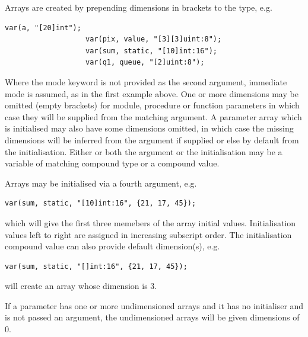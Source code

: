                 Arrays are created by prepending dimensions in brackets
                to the type, e.g.
                \begin{lstlisting}[gobble=16, language=threepl]
                   var(a, "[20]int");
                   var(pix, value, "[3][3]uint:8");
                   var(sum, static, "[10]int:16");
                   var(q1, queue, "[2]uint:8");
                \end{lstlisting}
                Where the mode keyword is not provided as the second argument,
                immediate mode is assumed, as in the first example above.
                One or more dimensions may be omitted (empty brackets) for module,
                procedure or function parameters in which case they will be
                supplied from the matching argument. A parameter array which is
                initialised may also have some dimensions omitted, in which case
                the missing dimensions will be inferred from the  argument if
                supplied or else by default from the initialisation. Either or both
                the argument or the initialisation may be a variable of matching
                compound type or a compound value.
                
                Arrays may be initialised via a fourth argument, e.g.
                \begin{lstlisting}[gobble=16, language=threepl]
                   var(sum, static, "[10]int:16", {21, 17, 45});
                \end{lstlisting}
                which will give the first three memebers of the array initial
                values. Initialisation values left to right are assigned in
                increasing subscript order. The initialisation compound value
                can also provide default dimension(s), e.g.
                \begin{lstlisting}[gobble=16, language=threepl]
                   var(sum, static, "[]int:16", {21, 17, 45});
                \end{lstlisting}
                will create an array whose dimension is 3.
                
                If a parameter has one or more undimensioned arrays and it has
                no initialiser and is not passed an argument, the undimensioned
                arrays will be given dimensions of 0.

